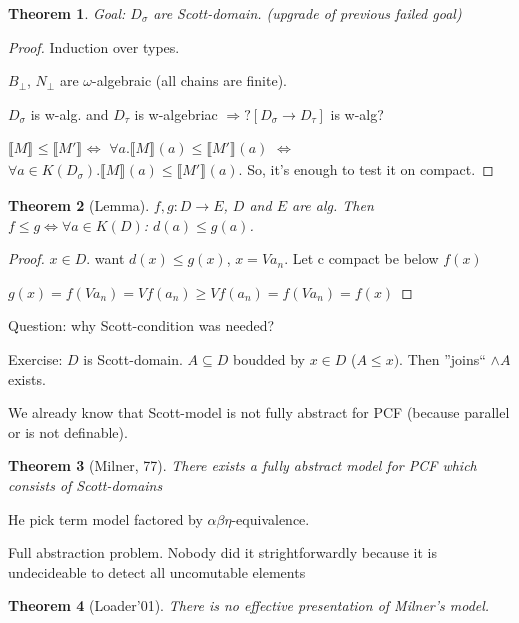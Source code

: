 \documentclass[a4paper,10pt]{book}
\newtheorem{theorem}{Theorem}
\newcommand{\sem}[2]{ \llbracket#1\rrbracket_{#2} }
\newcommand{\rarr}{ \rightarrow }
\begin{document}
\begin{theorem}
Goal: $D_\sigma$ are Scott-domain.  (upgrade of previous failed goal)
\end{theorem}

\begin{proof}
 Induction over types.
 
 $B_\bot$, $N_\bot$ are $\omega$-algebraic (all chains are finite).
 
 $D_\sigma$ is w-alg. and $D_\tau$ is w-algebriac $\Rightarrow? [D_\sigma \rarr D_\tau]$ is w-alg?
 
 $\sem{M}{}\leq\sem{M'}{} \Leftrightarrow$ $\forall a . \sem{M}{}(a)\leq\sem{M'}{}(a)$
 $\Leftrightarrow$ $\forall a \in K(D_\sigma). \sem{M}{}(a)\leq\sem{M'}{}(a)$. So, it's enough to 
 test it on compact.
 
\end{proof}

\begin{theorem}[Lemma]
 $f,g: D\rarr E$, $D$ and $E$ are alg. Then $f\leq g \Leftrightarrow\forall a\in K(D)$:
 $d(a)\leq g(a)$.
\end{theorem}

\begin{proof}
 $x\in D$. want $d(x) \leq g(x)$, $x=Va_n$. Let c compact be below $f(x)$
 
 $g(x) = f(Va_n) = Vf(a_n) \geq Vf(a_n) = f(Va_n) = f(x)$
\end{proof}

Question: why Scott-condition was needed?

Exercise: $D$ is Scott-domain. $A\subseteq D$ boudded by $x\in D$ ($A\leq x)$. Then
''joins`` $\wedge A$ exists.

We already know that Scott-model is not fully abstract for PCF (because parallel or is not 
definable).

\begin{theorem}[Milner, 77]
 There exists a fully abstract model for PCF which consists of Scott-domains
\end{theorem}

He pick term model factored by $\alpha\beta\eta$-equivalence.
 
Full abstraction problem. Nobody did it strightforwardly because it is undecideable to detect all
uncomutable elements
 
\begin{theorem}[Loader'01]
There is no effective presentation of Milner's model.
\end{theorem}
\end{document}
